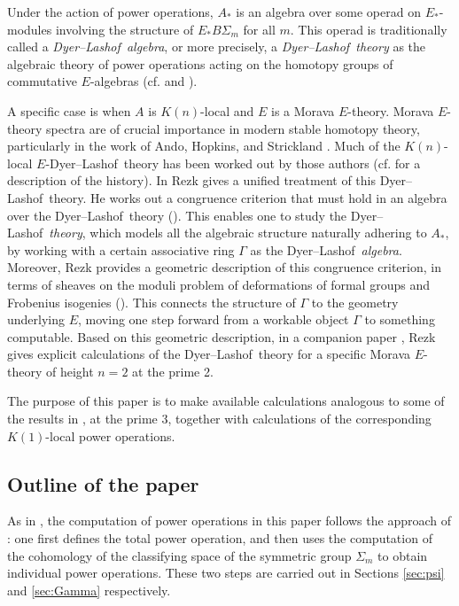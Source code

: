 \documentclass{gtpart}
\theoremstyle{definition}
\theoremstyle{remark}
\newcommand{\cff}[2]{cf.\thinspace{\cite[#1]{#2}}}
\newcommand{\DL}{Dyer--Lashof~}
\newcommand{\G}{\Gamma}
\begin{document}
Under the action of power operations, $A_*$ is an algebra over some operad on $E_*$-modules involving the structure of $E_* B\Sigma_m$ for all $m$.  
This operad is traditionally called a {\em \DL algebra}, or more precisely, 
a {\em \DL theory} as the algebraic theory of power operations acting on the homotopy groups of commutative $E$-algebras 
(\cff{Chapters III, VIII, and IX}{H_infty} and \cite[Section 9]{lpo}).  

A specific case is when $A$ is $K(n)$-local and $E$ is a Morava $E$-theory.  
Morava $E$-theory spectra are of crucial importance in modern stable homotopy theory, 
particularly in the work of Ando, Hopkins, and Strickland \cite{cube}.  
Much of the $K(n)$-local $E$-\DL theory has been worked out by those authors (\cff{1.5}{cong} for a description of the history).  
In \cite{cong} Rezk gives a unified treatment of this \DL theory.  
He works out a congruence criterion that must hold in an algebra over the \DL theory (\cite[Theorem A]{cong}).  
This enables one to study the \DL {\em theory}, which models all the algebraic structure naturally adhering to $A_*$, 
by working with a certain associative ring $\G$ as the \DL {\em algebra}.  
Moreover, Rezk provides a geometric description of this congruence criterion, 
in terms of sheaves on the moduli problem of deformations of formal groups and Frobenius isogenies (\cite[Theorem B]{cong}).  
This connects the structure of $\G$ to the geometry underlying $E$, 
moving one step forward from a workable object $\G$ to something computable.  
Based on this geometric description, in a companion paper \cite{h2p2}, 
Rezk gives explicit calculations of the \DL theory for a specific Morava $E$-theory of height $n = 2$ at the prime 2.  

The purpose of this paper is to make available calculations analogous to some of the results in \cite{h2p2}, at the prime 3, 
together with calculations of the corresponding $K(1)$-local power operations.  


\subsection*{Outline of the paper}

As in \cite{h2p2}, the computation of power operations in this paper follows the approach of \cite{steenrod}: 
one first defines the total power operation, 
and then uses the computation of the cohomology of the classifying space of the symmetric group $\Sigma_m$ to obtain individual power operations.  
These two steps are carried out in Sections \ref{sec:psi} and \ref{sec:Gamma} respectively.  
\end{document}
